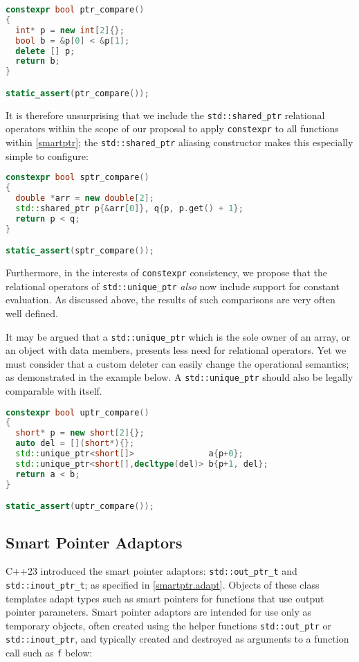 \documentclass[10pt]{article}
\newcommand*{\wgxxi}[1]{[\href{https://wg21.link/#1}{#1}]}
\begin{document}
\begin{lstlisting}[language=cpp]
constexpr bool ptr_compare()
{
  int* p = new int[2]{};
  bool b = &p[0] < &p[1];
  delete [] p;
  return b;
}

static_assert(ptr_compare());
\end{lstlisting}

It is therefore unsurprising that we include the \texttt{std::shared\_ptr}
relational operators within the scope of our proposal to apply
\texttt{constexpr} to all functions within \wgxxi{smartptr}; the
\texttt{std::shared\_ptr} aliasing constructor makes this especially simple to
configure:

\begin{lstlisting}[language=cpp]
constexpr bool sptr_compare()
{
  double *arr = new double[2];
  std::shared_ptr p{&arr[0]}, q{p, p.get() + 1};
  return p < q;
}

static_assert(sptr_compare());
\end{lstlisting}

Furthermore, in the interests of \texttt{constexpr} consistency, we propose
that the relational operators of \texttt{std::unique\_ptr} \emph{also} now
include support for constant evaluation. As discussed above, the results of
such comparisons are very often well defined.

It may be argued that a \texttt{std::unique\_ptr} which is the sole owner of an
array, or an object with data members, presents less need for relational
operators. Yet we must consider that a custom deleter can easily change the
operational semantics; as demonstrated in the example below. A
\texttt{std::unique\_ptr} should also be legally comparable with itself.

\begin{lstlisting}[language=cpp]
constexpr bool uptr_compare()
{
  short* p = new short[2]{};
  auto del = [](short*){};
  std::unique_ptr<short[]>               a{p+0};
  std::unique_ptr<short[],decltype(del)> b{p+1, del};
  return a < b;
}

static_assert(uptr_compare());
\end{lstlisting}

\subsection{Smart Pointer Adaptors}

C++23 introduced the smart pointer adaptors: \texttt{std::out\_ptr\_t} and
\texttt{std::inout\_ptr\_t}; as specified in \wgxxi{smartptr.adapt}. Objects of
these class templates adapt types such as smart pointers for functions that use
output pointer parameters. Smart pointer adaptors are intended for use only as
temporary objects, often created using the helper functions
\texttt{std::out\_ptr} or \texttt{std::inout\_ptr}, and typically created and
destroyed as arguments to a function call such as \texttt{f} below:
\end{document}
